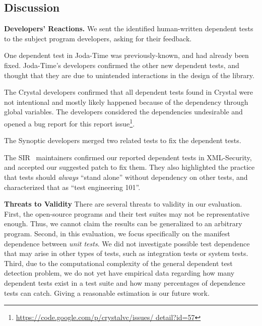 


\subsection{Discussion}
\label{sec:expdiscussion}


\noindent \textbf{Developers' Reactions.}
We sent the identified human-written dependent tests to the
subject program developers, asking for their feedback.

One dependent test in Joda-Time was previously-known,
and had already been fixed. Joda-Time's
developers confirmed the other new dependent
tests, and thought that they are due to unintended interactions
in the design of the library.

The Crystal developers confirmed that all dependent tests
found in Crystal were not intentional and mostly likely
happened because of the dependency
through global variables. The developers considered the
dependencies undesirable and opened a bug report for
this report issue\footnote{\url{https://code.google.com/p/crystalvc/issues/ detail?id=57}}.

The Synoptic developers merged two related tests to fix
the dependent tests.

The SIR~\cite{sir} maintainers confirmed our reported dependent
tests in XML-Security, and accepted our
suggested patch to fix them. They also highlighted the practice
that tests should \textit{always} ``stand alone''
without dependency on other tests, and characterized that as
``test engineering 101''. 

\vspace{1mm}
\noindent \textbf{Threats to Validity}
There are several threats to validity in our evaluation.
First, the \subjnum open-source
programs and their test suites may not be
representative enough. Thus, we cannot claim the results
can be generalized to an arbitrary program.
Second, in this evaluation, we focus specifically on
the {manifest dependence} between \textit{unit tests}.
We did not investigate possible test dependence that may arise
in other types of tests, such as integration tests
or system tests.
Third, due to the computational complexity of the general dependent test
detection problem, we do not yet have
empirical data regarding how many dependent
tests exist in a test suite and how many percentages of dependence tests
\ourtool can catch.  Giving a reasonable estimation is our future work.

